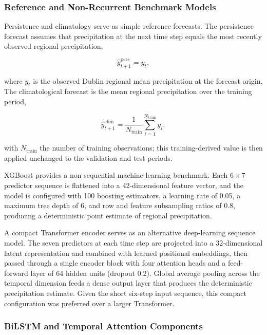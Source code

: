 \documentclass[referee,pdflatex,sn-basic]{sn-jnl}%
\theoremstyle{thmstyleone}%
\theoremstyle{thmstyletwo}%
\theoremstyle{thmstylethree}%
\begin{document}
\subsubsection{Reference and Non-Recurrent Benchmark Models}
\label{sec:benchmark_models}

Persistence and climatology serve as simple reference forecasts. The persistence forecast assumes that precipitation at the next time step equals the most recently observed regional precipitation,

\begin{equation}
\hat{y}_{t+1}^{\mathrm{pers}} = y_t ,
\label{eq:persistence}
\end{equation}

where $y_t$ is the observed Dublin regional mean precipitation at the forecast origin. The climatological forecast is the mean regional precipitation over the training period,

\begin{equation}
\hat{y}_{t+1}^{\mathrm{clim}} = \frac{1}{N_{\mathrm{train}}} \sum_{i=1}^{N_{\mathrm{train}}} y_i ,
\label{eq:climatology}
\end{equation}

with $N_{\mathrm{train}}$ the number of training observations; this training-derived value is then applied unchanged to the validation and test periods.

XGBoost provides a non-sequential machine-learning benchmark. Each $6\times7$ predictor sequence is flattened into a 42-dimensional feature vector, and the model is configured with 100 boosting estimators, a learning rate of 0.05, a maximum tree depth of 6, and row and feature subsampling ratios of 0.8, producing a deterministic point estimate of regional precipitation.

A compact Transformer encoder serves as an alternative deep-learning sequence model. The seven predictors at each time step are projected into a 32-dimensional latent representation and combined with learned positional embeddings, then passed through a single encoder block with four attention heads and a feed-forward layer of 64 hidden units (dropout 0.2). Global average pooling across the temporal dimension feeds a dense output layer that produces the deterministic precipitation estimate. Given the short six-step input sequence, this compact configuration was preferred over a larger Transformer.


\subsubsection{BiLSTM and Temporal Attention Components}
\label{sec:bilstm_attention_components}
\end{document}
